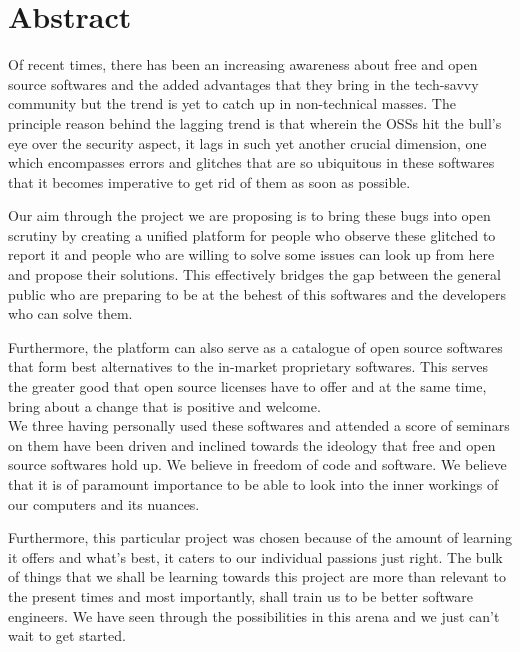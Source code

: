 \section*{Abstract}

Of recent times, there has been an increasing awareness about free and open source softwares and the added advantages that they bring in the tech-savvy community but the trend is yet to catch up in non-technical masses. The principle reason behind the lagging trend is that wherein the OSSs hit the bull’s eye over the security aspect, it lags in such yet another crucial dimension, one which encompasses errors and glitches that are so ubiquitous in these softwares that it becomes imperative to get rid of them as soon as possible.

Our aim through the project we are proposing is to bring these bugs into open scrutiny by creating a unified platform for people who observe these glitched to report it and people who are willing to solve some issues can look up from here and propose their solutions. This effectively bridges the gap between the general public who are preparing to be at the behest of this softwares and the developers who can solve them.

Furthermore, the platform can also serve as a catalogue of open source softwares that form best alternatives to the in-market proprietary softwares. This serves the greater good that open source licenses have to offer and at the same time, bring about a change that is positive and welcome.
\\

We three having personally used these softwares and attended a score of seminars on them have been driven and inclined towards the ideology that free and open source softwares hold up. We believe in freedom of code and software. We believe that it is of paramount importance to be able to look into the inner workings of our computers and its nuances.

Furthermore, this particular project was chosen because of the amount of learning it offers and what’s best, it caters to our individual passions just right. The bulk of things that we shall be learning towards this project are more than relevant to the present times and most importantly, shall train us to be better software engineers. We have seen through the possibilities in this arena and we just can’t wait to get started.